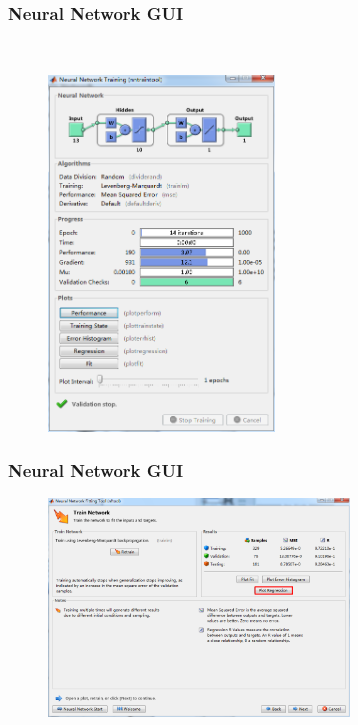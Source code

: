 \documentclass[slidestop,compress,mathserif,c]{beamer}
\begin{document}
\begin{frame}
\frametitle{Neural Network GUI}
~\\[-2.6cm]
\begin{figure}
\centering
\includegraphics[width=6cm]{9}
\end{figure}


\end{frame}


\begin{frame}
\frametitle{Neural Network GUI}

\begin{figure}
\centering
\includegraphics[width=8cm]{8}
\end{figure}


\end{frame}
\end{document}
